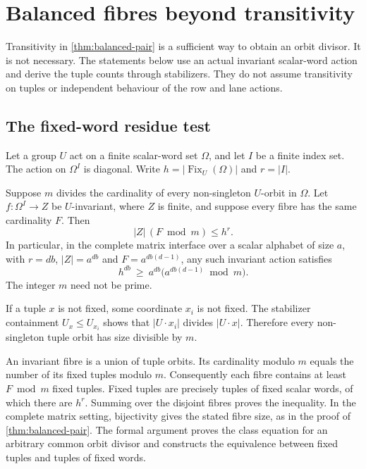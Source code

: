 \section{Balanced fibres beyond transitivity}
\label{sec:orbit-residues}

Transitivity in \cref{thm:balanced-pair} is a sufficient way to obtain
an orbit divisor.  It is not necessary.  The statements below use an
actual invariant scalar-word action and derive the tuple counts through
stabilizers.  They do not assume transitivity on tuples or independent
behaviour of the row and lane actions.

\subsection{The fixed-word residue test}

Let a group $U$ act on a finite scalar-word set $\Omega$, and let $I$
be a finite index set.  The action on $\Omega^I$ is diagonal.  Write
$h=|\operatorname{Fix}_U(\Omega)|$ and $r=|I|$.

\begin{theorem}
\label{thm:fixed-word-residue}
Suppose $m$ divides the cardinality of every non-singleton $U$-orbit
in $\Omega$.  Let $f\colon\Omega^I\to Z$ be $U$-invariant, where
$Z$ is finite, and suppose every fibre has the same cardinality $F$.
Then
\[
 |Z|\,(F\bmod m)\le h^r.
\]
In particular, in the complete matrix interface over a scalar alphabet
of size $a$, with $r=db$, $|Z|=a^{db}$ and
$F=a^{db(d-1)}$, any such invariant action satisfies
\begin{equation}\label{eq:fixed-word-residue}
 h^{db}\ \ge\ a^{db}\bigl(a^{db(d-1)}\bmod m\bigr).
\end{equation}
The integer $m$ need not be prime.
\end{theorem}
\begin{outline}
If a tuple $x$ is not fixed, some coordinate $x_i$ is not fixed.
The stabilizer containment $U_x\le U_{x_i}$ shows that
$|U\cdot x_i|$ divides $|U\cdot x|$.  Therefore every non-singleton
tuple orbit has size divisible by $m$.

An invariant fibre is a union of tuple orbits.  Its cardinality modulo
$m$ equals the number of its fixed tuples modulo $m$.  Consequently
each fibre contains at least $F\bmod m$ fixed tuples.  Fixed tuples
are precisely tuples of fixed scalar words, of which there are $h^r$.
Summing over the disjoint fibres proves the inequality.  In the complete
matrix setting, bijectivity gives the stated fibre size, as in the proof
of \cref{thm:balanced-pair}.
The formal argument proves the class equation for an arbitrary common
orbit divisor and constructs the equivalence between fixed tuples and
tuples of fixed words.
\end{outline}

